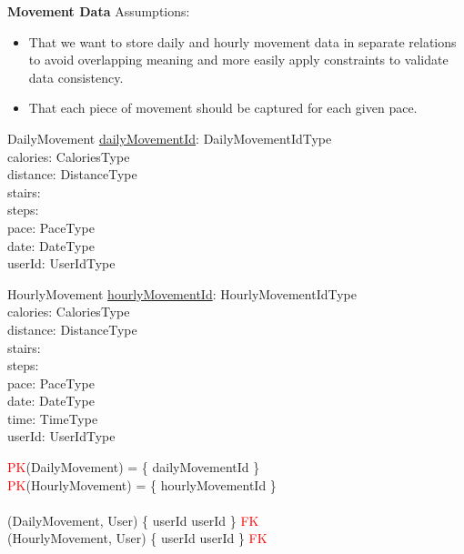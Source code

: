 \documentclass{article}
\begin{document}
\newline 
\textbf{Movement Data}
\newline \newline Assumptions:
\begin{itemize}
  \item That we want to store daily and hourly movement data in separate relations to avoid overlapping meaning and more easily apply constraints to validate data consistency.
  \item That each piece of movement should be captured for each given pace.
\end{itemize}
\begin{schema}{DailyMovement}
    \underline{dailyMovementId}: DailyMovementIdType \\
    calories: CaloriesType \\
    distance: DistanceType \\ 
    stairs: \nat \\
    steps: \nat \\
    pace: PaceType \\
    date: DateType \\
    userId: UserIdType \\
\end{schema}
\begin{schema}{HourlyMovement}
    \underline{hourlyMovementId}: HourlyMovementIdType \\
    calories: CaloriesType \\
    distance: DistanceType \\ 
    stairs: \nat \\
    steps: \nat \\
    pace: PaceType \\
    date: DateType \\
    time: TimeType \\
    userId: UserIdType \\
\end{schema}
\begin{zed}
\textcolor{red}{PK}(DailyMovement) = \{ dailyMovementId \} \\
\textcolor{red}{PK}(HourlyMovement) = \{ hourlyMovementId \} \\
\newline \\ 
(DailyMovement, User) \mapsto \{ userId \mapsto userId \} \in \textcolor{red}{FK} \\
(HourlyMovement, User) \mapsto \{ userId \mapsto userId \} \in \textcolor{red}{FK} \\
\end{zed}
\end{document}
